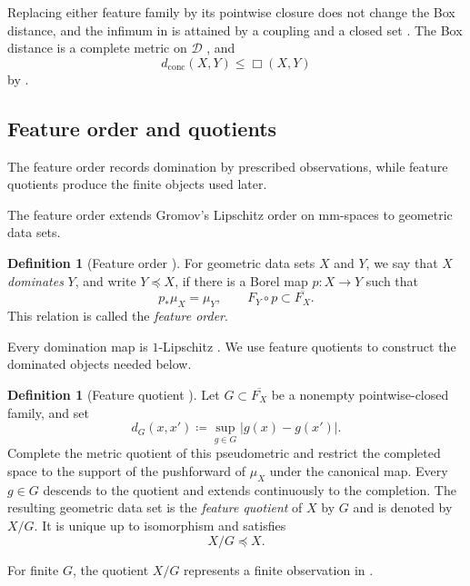 \documentclass[11pt]{amsart}
\theoremstyle{plain}
\theoremstyle{definition}
\newtheorem{definition}[theorem]{Definition}
\theoremstyle{remark}
\newcommand{\D}{\mathcal D}
\newcommand{\dconc}{d_{\mathrm{conc}}}
\begin{document}
Replacing either feature family by its pointwise closure does not change the Box distance, and the infimum in  is attained by a coupling and a closed set \cite[Theorem~5.14]{gds1}. The Box distance is a complete metric on $\D$ \cite[Theorem~1.4]{gds1}, and
\[\dconc(X,Y)\leq\Box(X,Y)\]
by \cite[Proposition~5.8]{gds1}.

\subsection{Feature order and quotients}
\label{subsec:feature-order-quotient}

The feature order records domination by prescribed observations, while feature quotients produce the finite objects used later.

The feature order \cite[Definition~3.8]{gds1} extends Gromov's Lipschitz order on mm-spaces \cite[Definition~3\(\frac12\).15, p.~134]{gromov2007met} to geometric data sets.

\begin{definition}[Feature order {\cite[Definition~3.8]{gds1}}]
\label{def:feature-order}
For geometric data sets $X$ and $Y$, we say that $X$ \emph{dominates} $Y$, and write $Y\preceq X$, if there is a Borel map $p\colon X\to Y$ such that
\[p_*\mu_X=\mu_Y,\qquad F_Y\circ p\subset\overline{F_X}.\]
This relation is called the \emph{feature order}.
\end{definition}

Every domination map is $1$-Lipschitz \cite[Proposition~3.10]{gds1}. We use feature quotients to construct the dominated objects needed below.

\begin{definition}[Feature quotient {\cite[Definition~3.16 and Propositions~3.17 and~3.19]{gds1}}]
\label{def:feature-quotient}
Let $G\subset\overline{F_X}$ be a nonempty pointwise-closed family, and set
\[d_G(x,x')\coloneqq\sup_{g\in G}|g(x)-g(x')|.\]
Complete the metric quotient of this pseudometric and restrict the completed space to the support of the pushforward of $\mu_X$ under the canonical map. Every $g\in G$ descends to the quotient and extends continuously to the completion. The resulting geometric data set is the \emph{feature quotient} of $X$ by $G$ and is denoted by $X/G$. It is unique up to isomorphism and satisfies
\[X/G\preceq X.\]
\end{definition}

For finite $G$, the quotient $X/G$ represents a finite observation in .
\end{document}
